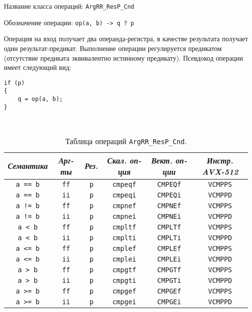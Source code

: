 \documentclass[a4paper,12pt]{extarticle}                     %
\numberwithin{equation}{section}                             %
\numberwithin{figure}{section}                               %
\numberwithin{table}{section}                                %
\theoremstyle{plain}                                         %
\numberwithin{theorem}{section}                              %
\numberwithin{lemma}{section}                                %
\numberwithin{definition}{section}                           %
\begin{document}
Название класса операций: \texttt{ArgRR\_ResP\_Cnd}

Обозначение операции: \texttt{op(a, b) -> q ? p}

Операция на вход получает два операнда-регистра, в качестве результата получает один результат-предикат. Выполнение операции регулируется предикатом (отсутствие предиката эквивалентно истинному предикату). Псевдокод операции имеет следующий вид:

\begin{lstlisting}[caption={Псевдокод операции ArgRR\_ResP\_Cnd.}]
if (p)
{
    q = op(a, b);
}

\end{lstlisting}

\

\begin{table}[!h]
\setcaptionmargin{0mm}
\onelinecaptionsfalse
{}
\caption{Таблица операций \texttt{ArgRR\_ResP\_Cnd}.}
\bigskip
\begin{tabular}{|c|c|c|c|c|c|}
\hline
\textit{Семантика} & \textit{Арг-ты} & \textit{Рез.} & \textit{Скал. оп-ция} & \textit{Вект. оп-ции} & \textit{Инстр. AVX-512} \\
\hline
\texttt{a == b} & \texttt{ff} & \texttt{p} & \texttt{cmpeqf} & \texttt{CMPEQf} & \texttt{VCMPPS} \\
\texttt{a == b} & \texttt{ii} & \texttt{p} & \texttt{cmpeqi} & \texttt{CMPEQi} & \texttt{VCMPPD} \\
\texttt{a != b} & \texttt{ff} & \texttt{p} & \texttt{cmpnef} & \texttt{CMPNEf} & \texttt{VCMPPS} \\
\texttt{a != b} & \texttt{ii} & \texttt{p} & \texttt{cmpnei} & \texttt{CMPNEi} & \texttt{VCMPPD} \\
\texttt{a < b}  & \texttt{ff} & \texttt{p} & \texttt{cmpltf} & \texttt{CMPLTf} & \texttt{VCMPPS} \\
\texttt{a < b}  & \texttt{ii} & \texttt{p} & \texttt{cmplti} & \texttt{CMPLTi} & \texttt{VCMPPD} \\
\texttt{a <= b} & \texttt{ff} & \texttt{p} & \texttt{cmplef} & \texttt{CMPLEf} & \texttt{VCMPPS} \\
\texttt{a <= b} & \texttt{ii} & \texttt{p} & \texttt{cmplei} & \texttt{CMPLEi} & \texttt{VCMPPD} \\
\texttt{a > b}  & \texttt{ff} & \texttt{p} & \texttt{cmpgtf} & \texttt{CMPGTf} & \texttt{VCMPPS} \\
\texttt{a > b}  & \texttt{ii} & \texttt{p} & \texttt{cmpgti} & \texttt{CMPGTi} & \texttt{VCMPPD} \\
\texttt{a >= b} & \texttt{ff} & \texttt{p} & \texttt{cmpgef} & \texttt{CMPGEf} & \texttt{VCMPPS} \\
\texttt{a >= b} & \texttt{ii} & \texttt{p} & \texttt{cmpgei} & \texttt{CMPGEi} & \texttt{VCMPPD} \\
\hline
\end{tabular}
\end{table}
\end{document}
